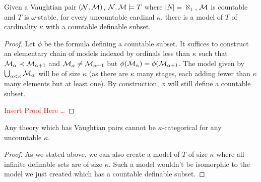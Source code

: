 \begin{theorem}\label{theorem_uncountable_vaightian_pairs}
Given a Vaughtian pair \((\mathcal{N}, \mathcal{M})\), \(\mathcal{N}, \mathcal{M} \models T\) where \(|N| = \aleph_1\), \(\mathcal{M}\) is countable and \(T\) is \(\omega\)-stable, for every uncountable cardinal \(\kappa\), there is a model of \(T\) of cardinality \(\kappa\) with a countable definable subset.  
\end{theorem}

\begin{proof}
Let \(\phi\) be the formula defining a countable subset. 
It suffices to construct an elementary chain of models indexed by ordinals less than \(\kappa\) such that \(\mathcal{M}_\alpha \prec \mathcal{M}_{\alpha+1}\) and \(\mathcal{M}_\alpha \neq \mathcal{M}_{\alpha+1}\) but \(\phi(\mathcal{M}_\alpha) = \phi(\mathcal{M}_{\alpha+1}\). 
The model given by \(\bigcup_{\alpha<\kappa} \mathcal{M}_\alpha\) will be of size \(\kappa\) (as there are \(\kappa\) many stages, each adding fewer than \(\kappa\) many elements but at least one).
By construction, \(\phi\) will still define a countable subset. 

\textcolor{red}{Insert Proof Here \ldots} 
\end{proof}

\begin{theorem}\label{theorem_vaughtian_pairs_categoricity}
Any theory which has Vaughtian pairs cannot be \(\kappa\)-categorical for any uncountable \(\kappa\).
\end{theorem}

\begin{proof}
As we stated above, we can also create a model of \(T\) of size \(\kappa\) where all infinite definable sets are of size \(\kappa\). 
Such a model wouldn't be isomorphic to the model we just created which has a countable definable subset. 
\end{proof}
